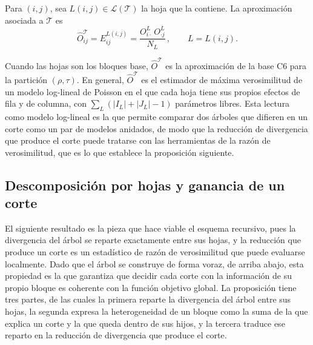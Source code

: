 \begin{definicion}\label{def:aprox-arbol}
Para $(i,j)$, sea $L(i,j)\in\mathcal{L}(\mathcal{T})$ la hoja que la contiene.
La aproximación asociada a $\mathcal{T}$ es
\[
  \hat O^{\mathcal{T}}_{ij} = E^{L(i,j)}_{ij}
  = \frac{O^{L}_{i\cdot}\, O^{L}_{\cdot j}}{N_L}\,,\qquad L = L(i,j).
\]
\end{definicion}

Cuando las hojas son los bloques base, $\hat O^{\mathcal{T}}$ es la
aproximación de la base C6 \citep{Banerjee2007} para la partición $(\rho,\tau)$.
En general, $\hat O^{\mathcal{T}}$ es el estimador de máxima verosimilitud de un
modelo log-lineal de Poisson en el que cada hoja tiene sus propios efectos de
fila y de columna, con $\sum_{L}(|I_L|+|J_L|-1)$ parámetros libres. Esta lectura
como modelo log-lineal es la que permite comparar dos árboles que difieren en
un corte como un par de modelos anidados, de modo que la reducción de
divergencia que produce el corte puede tratarse con las herramientas de la razón
de verosimilitud, que es lo que establece la proposición siguiente.

\subsection{Descomposición por hojas y ganancia de un corte}\label{sec:prop-descomp}

El siguiente resultado es la pieza que hace viable el esquema recursivo, pues la
divergencia del árbol se reparte exactamente entre sus hojas, y la reducción que
produce un corte es un estadístico de razón de verosimilitud que puede evaluarse
localmente. Dado que el árbol se construye de forma voraz, de arriba abajo, esta
propiedad es la que garantiza que decidir cada corte con la información de su
propio bloque es coherente con la función objetivo global. La proposición tiene
tres partes, de las cuales la primera reparte la divergencia del árbol entre sus
hojas, la segunda expresa la heterogeneidad de un bloque como la suma de la que
explica un corte y la que queda dentro de sus hijos, y la tercera traduce ese
reparto en la reducción de divergencia que produce el corte.

